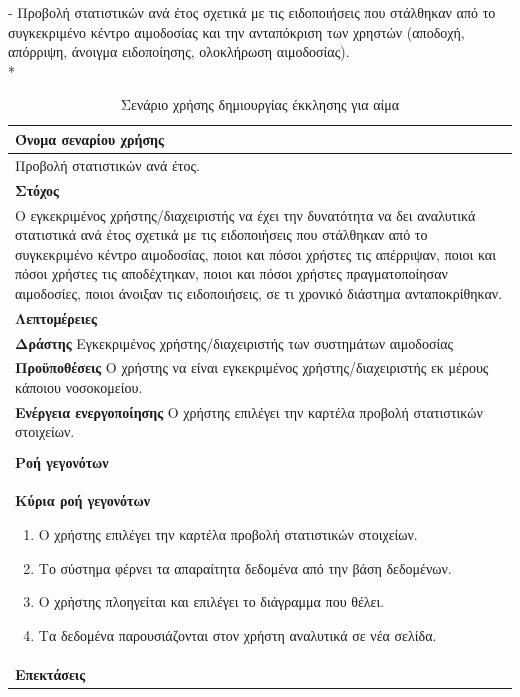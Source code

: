 

- Προβολή στατιστικών ανά έτος σχετικά με τις ειδοποιήσεις που στάλθηκαν από το συγκεκριμένο κέντρο αιμοδοσίας και την ανταπόκριση των χρηστών (αποδοχή, απόρριψη, άνοιγμα ειδοποίησης, ολοκλήρωση αιμοδοσίας).
\\*


\begin{table}[H]
	\begin{center}
	    \begin{tabular}{|p{\dimexpr \linewidth-2\tabcolsep}|}
	    \hline
	    \rowcolor{grayy}
	    \textbf{Όνομα σεναρίου χρήσης}
	    \\ \hline    
	    Προβολή στατιστικών ανά έτος.
	     \\ \hline
	    \rowcolor{grayy}
	    \textbf{\textbf{Στόχος}}
	    \\ \hline
	 	 Ο εγκεκριμένος χρήστης/διαχειριστής να έχει την δυνατότητα να δει αναλυτικά στατιστικά ανά έτος σχετικά με τις ειδοποιήσεις που στάλθηκαν από το συγκεκριμένο κέντρο αιμοδοσίας, ποιοι και πόσοι χρήστες τις απέρριψαν, ποιοι και πόσοι χρήστες τις αποδέχτηκαν, ποιοι και πόσοι χρήστες πραγματοποίησαν αιμοδοσίες, ποιοι άνοιξαν τις ειδοποιήσεις, σε τι χρονικό διάστημα ανταποκρίθηκαν.
	    \\ \hline
	    \rowcolor{grayy}
	    \textbf{Λεπτομέρειες}
	    \\ \hline
		\textbf{Δράστης} Εγκεκριμένος χρήστης/διαχειριστής των συστημάτων αιμοδοσίας
		\\*
		\textbf{Προϋποθέσεις} Ο χρήστης να είναι εγκεκριμένος χρήστης/διαχειριστής εκ μέρους κάποιου νοσοκομείου.
		\\*
		\textbf{Ενέργεια ενεργοποίησης} Ο χρήστης επιλέγει την καρτέλα προβολή στατιστικών στοιχείων.
		\\ \hline
	    \\ \hline
		\rowcolor{grayy}    
	    \textbf{Ροή γεγονότων}
	    \\* 
		\textbf{Κύρια ροή γεγονότων}
		\begin{enumerate}
		\item	 Ο χρήστης επιλέγει την καρτέλα προβολή στατιστικών στοιχείων.
		\item Το σύστημα φέρνει τα απαραίτητα δεδομένα από την βάση δεδομένων.
		\item Ο χρήστης πλοηγείται και επιλέγει το διάγραμμα που θέλει.
		\item Τα δεδομένα παρουσιάζονται στον χρήστη αναλυτικά  σε νέα σελίδα.
		\end{enumerate}
		\\*
		\textbf{Επεκτάσεις}
		   \\ \hline
	    \end{tabular}
	    \caption{Σενάριο χρήσης δημιουργίας έκκλησης για αίμα}
	    \label{tab:view_year_statistics} 
	\end{center}
\end{table}


